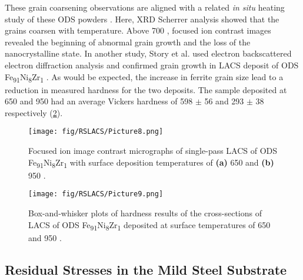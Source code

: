 		These grain coarsening observations are aligned with a related \textit{in situ} heating study of these ODS powders \cite{RN550}. Here, XRD Scherrer analysis showed that the grains coarsen with temperature. Above 700 \celsius{}, focused ion contrast images revealed the beginning of abnormal grain growth and the loss of the nanocrystalline state. In another study, Story et al. used electron backscattered electron diffraction analysis and confirmed grain growth in LACS deposit of ODS Fe\textsubscript{91}Ni\textsubscript{8}Zr\textsubscript{1} \cite{RN383}. As would be expected, the increase in ferrite grain size lead to a reduction in measured hardness for the two deposits. The sample deposited at 650 \celsius{} and 950 \celsius{} had an average Vickers hardness of 598 $ \pm $  56 and 293 $ \pm $  38 respectively (\ref{fig:RSLACS9}).
		
		
		
		
		\begin{figure}
			\centering
			\texttt{[image: fig/RSLACS/Picture8.png]}
			\caption{Focused ion image contrast micrographs of single-pass LACS of ODS Fe\textsubscript{91}Ni\textsubscript{8}Zr\textsubscript{1} with surface deposition temperatures of \textbf{(a)} 650 \celsius{} and \textbf{(b)} 950 \celsius{}.}
			\label{fig:RSLACS8}
		\end{figure}
	
	
		\begin{figure}
			\centering
			\texttt{[image: fig/RSLACS/Picture9.png]}
			\caption{Box-and-whisker plots of hardness results of the cross-sections of LACS of ODS Fe\textsubscript{91}Ni\textsubscript{8}Zr\textsubscript{1} deposited at surface temperatures of 650 \celsius{} and 950 \celsius{}.}
			\label{fig:RSLACS9}
		\end{figure}
		

		
	
	\subsection*{Residual Stresses in the Mild Steel Substrate}
	
